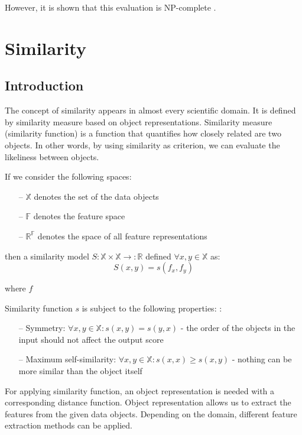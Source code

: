  However, it is shown that this evaluation is NP-complete .

\section{Similarity}
\subsection{Introduction}
The concept of similarity appears in almost every scientific domain. It is defined by similarity measure based on object representations.
Similarity measure (similarity function) is a function that quantifies how closely related are two objects. 
In other words, by using similarity as criterion, we can evaluate the likeliness between objects. 

If we consider the following spaces: 
\begin{itemize}
	\item[--]  $\mathds{X}$ denotes the set of the data objects
	\item[--]  $\mathds{F}$ denotes the feature space
	\item[--]  $\mathds{R} ^  \mathds{F}$ denotes the space of all feature representations
\end{itemize}

then a similarity model $S:\mathds{X} \times \mathds{X} \rightarrow :\mathds{R}$ defined $\forall x,y \in \mathds{X}$ as:
\begin{equation}
	S(x,y) = s(f_{x},f_{y})
\end{equation}

where $f$ 

Similarity function $s$ is subject to the following properties: \cite{Santini:1999:SM:317043.317048}:

\begin{itemize}
	\item[--] Symmetry: $\forall x,y \in \mathds{X}: s(x,y) = s(y,x)$ - the order of the objects in the input should not affect the output score
	\item[--] Maximum self-similarity: $\forall x,y \in \mathds{X}: s(x,x) \geqslant s(x,y)$ - nothing can be more similar than the object itself
\end{itemize}

For applying similarity function, an object representation is needed with a corresponding distance function. 
Object representation allows us to extract the features from the given data objects. 
Depending on the domain, different feature extraction methods can be applied. 

